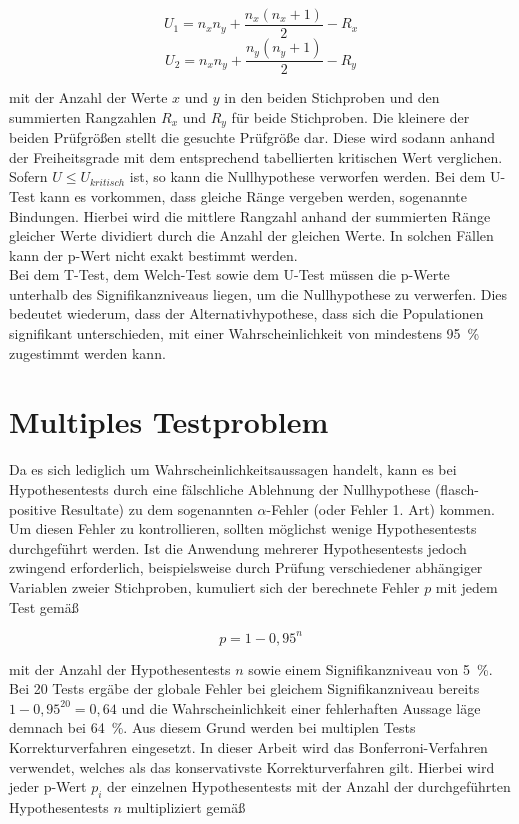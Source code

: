 \begin{equation}
U_1 = n_{x}n_{y} + \frac{n_{x}(n_{x}+1)}{2} - R_x \nonumber
\end{equation}
\begin{equation}
U_2 = n_{x}n_{y} + \frac{n_{y}(n_{y}+1)}{2} - R_y
\end{equation}

mit der Anzahl der Werte $x$ und $y$ in den beiden Stichproben und den summierten Rangzahlen $R_x$ und $R_y$ für beide Stichproben. Die kleinere der beiden Prüfgrößen stellt die gesuchte Prüfgröße dar. Diese wird sodann anhand der Freiheitsgrade mit dem entsprechend tabellierten kritischen Wert verglichen. Sofern $U\leq U_{kritisch}$ ist, so kann die Nullhypothese verworfen werden. Bei dem U-Test kann es vorkommen, dass gleiche Ränge vergeben werden, sogenannte Bindungen. Hierbei wird die mittlere Rangzahl anhand der summierten Ränge gleicher Werte dividiert durch die Anzahl der gleichen Werte. In solchen Fällen kann der p-Wert nicht exakt bestimmt werden. \parencite{hedderich_angewandte_2016}\\

Bei dem T-Test, dem Welch-Test sowie dem U-Test müssen die p-Werte unterhalb des Signifikanzniveaus liegen, um die Nullhypothese zu verwerfen. Dies bedeutet wiederum, dass der Alternativhypothese, dass sich die Populationen signifikant unterschieden, mit einer Wahrscheinlichkeit von mindestens 95~\% zugestimmt werden kann. \parencite{hedderich_angewandte_2016}\\

\section{Multiples Testproblem}

Da es sich lediglich um Wahrscheinlichkeitsaussagen handelt, kann es bei Hypothesentests durch eine fälschliche Ablehnung der Nullhypothese (flasch-positive Resultate) zu dem sogenannten $\alpha$-Fehler (oder Fehler 1. Art) kommen. Um diesen Fehler zu kontrollieren, sollten möglichst wenige Hypothesentests durchgeführt werden. Ist die Anwendung mehrerer Hypothesentests jedoch zwingend erforderlich, beispielsweise durch Prüfung verschiedener abhängiger Variablen zweier Stichproben, kumuliert sich der berechnete Fehler $p$ mit jedem Test gemäß

\begin{equation}
p = 1-0,95^n
\end{equation}

mit der Anzahl der Hypothesentests $n$ sowie einem Signifikanzniveau von 5~\%. Bei 20 Tests ergäbe der globale Fehler bei gleichem Signifikanzniveau bereits $1-0,95^20=0,64$ und die Wahrscheinlichkeit einer fehlerhaften Aussage läge demnach bei 64~\%. Aus diesem Grund werden bei multiplen Tests Korrekturverfahren eingesetzt. In dieser Arbeit wird das Bonferroni-Verfahren verwendet, welches als das konservativste Korrekturverfahren gilt. Hierbei wird jeder p-Wert $p_i$ der einzelnen Hypothesentests mit der Anzahl der durchgeführten Hypothesentests $n$ multipliziert gemäß

